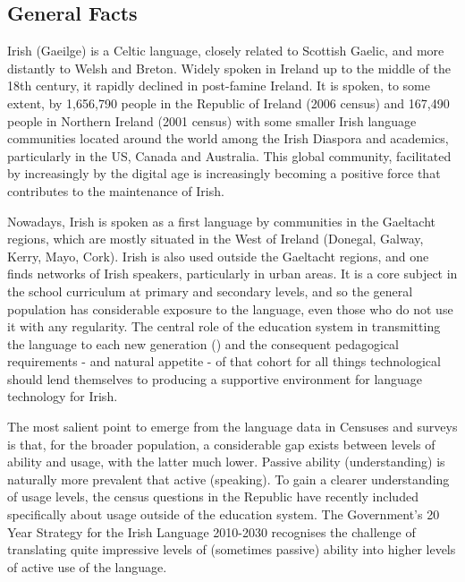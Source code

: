 \clearpage

\label{IrishInfso_en}

\begin{multicols}{2}

\subsection{General Facts}

Irish (Gaeilge) is a Celtic language, closely related to Scottish Gaelic, and more distantly to Welsh and Breton. Widely spoken in Ireland up to the middle of the 18th century, it rapidly declined in post-famine Ireland. It is spoken, to some extent, by 1,656,790 people in the Republic of Ireland (2006 census) and 167,490 people in Northern Ireland (2001 census) with some smaller Irish language communities located around the world among the Irish Diaspora and academics, particularly in the US, Canada and Australia. This global community, facilitated by increasingly by the digital age is increasingly becoming a positive force that contributes to the maintenance of Irish. 

Nowadays,  Irish is spoken as a first language by communities in the Gaeltacht regions, which are mostly situated in the West of Ireland (Donegal, Galway, Kerry, Mayo, Cork). Irish is also used outside the Gaeltacht regions, and one finds networks of Irish speakers, particularly in urban areas.   It is a core subject in the school curriculum at primary and secondary levels, and so the general population has considerable exposure to the language, even those who do not use it with any regularity. The central role of the education system in transmitting the language to each new generation (\cite{oriagain97}) and the consequent pedagogical requirements - and natural appetite - of that cohort for all things technological should lend themselves to producing a supportive environment for language technology for Irish.

The most salient point to emerge from the language data in Censuses and surveys is that, for the broader population, a considerable gap exists between levels of ability and usage, with the latter much lower. Passive ability (understanding) is naturally more prevalent that active (speaking). To gain a clearer understanding of usage levels, the census questions in the Republic have recently included specifically about usage outside of the education system. The Government's 20 Year Strategy for the Irish Language 2010-2030 recognises the challenge of translating quite impressive levels of (sometimes passive) ability into higher levels of active use of the language.


\end{multicols}
